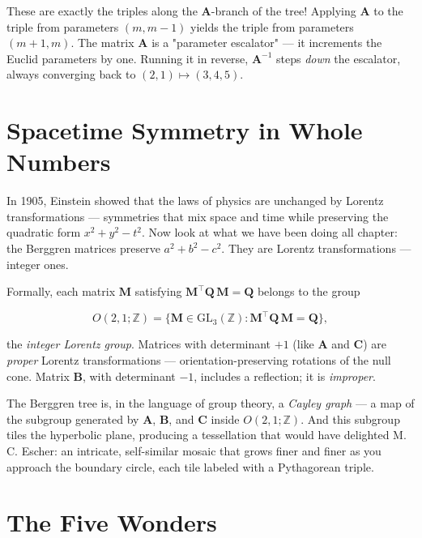 \documentclass[11pt,twoside,openright]{book}
\theoremstyle{definition}
\theoremstyle{remark}
\begin{document}
These are exactly the triples along the $\mathbf{A}$-branch of the tree! Applying $\mathbf{A}$ to the triple from parameters $(m, m-1)$ yields the triple from parameters $(m+1, m)$. The matrix $\mathbf{A}$ is a "parameter escalator" --- it increments the Euclid parameters by one. Running it in reverse, $\mathbf{A}^{-1}$ steps \textit{down} the escalator, always converging back to $(2, 1) \mapsto (3, 4, 5)$.



\section{Spacetime Symmetry in Whole Numbers}

In 1905, Einstein showed that the laws of physics are unchanged by Lorentz transformations --- symmetries that mix space and time while preserving the quadratic form $x^2 + y^2 - t^2$. Now look at what we have been doing all chapter: the Berggren matrices preserve $a^2 + b^2 - c^2$. They are Lorentz transformations --- integer ones.

Formally, each matrix $\mathbf{M}$ satisfying $\mathbf{M}^\top \mathbf{Q}\, \mathbf{M} = \mathbf{Q}$ belongs to the group

\[O(2,1;\mathbb{Z}) = \{\mathbf{M} \in \mathrm{GL}_3(\mathbb{Z}) : \mathbf{M}^\top \mathbf{Q}\, \mathbf{M} = \mathbf{Q}\},\]

the \textit{integer Lorentz group}. Matrices with determinant $+1$ (like $\mathbf{A}$ and $\mathbf{C}$) are \textit{proper} Lorentz transformations --- orientation-preserving rotations of the null cone. Matrix $\mathbf{B}$, with determinant $-1$, includes a reflection; it is \textit{improper}.

The Berggren tree is, in the language of group theory, a \textit{Cayley graph} --- a map of the subgroup generated by $\mathbf{A}$, $\mathbf{B}$, and $\mathbf{C}$ inside $O(2,1;\mathbb{Z})$. And this subgroup tiles the hyperbolic plane, producing a tessellation that would have delighted M. C. Escher: an intricate, self-similar mosaic that grows finer and finer as you approach the boundary circle, each tile labeled with a Pythagorean triple.




\section{The Five Wonders}
\end{document}
